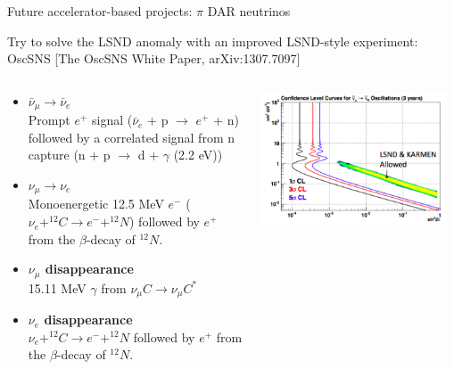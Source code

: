 \begin{frame}[t]{Future accelerator-based projects: $\pi$ DAR neutrinos}

Try to solve the LSND anomaly with an improved LSND-style experiment: OscSNS
{\color{blue}[The OscSNS White Paper, arXiv:1307.7097]}
\begin{columns}
  \begin{column}{0.50\textwidth}
     \begin{itemize}
       \item {\bf $\bar{\nu}_{\mu} \rightarrow \bar{\nu}_{e}$ }\\
         {\scriptsize
           Prompt $e^{+}$ signal ({\color{red}$\bar{\nu}_{e}$ + p $\rightarrow$ $e^{+}$ + n})
           followed by a correlated signal from n capture ({\color{red}n + p $\rightarrow$ d + $\gamma$} (2.2 eV))\\
         }
       \item {\bf $\nu_{\mu} \rightarrow \nu_{e}$ }\\
         {\scriptsize
           Monoenergetic 12.5 MeV $e^{-}$
           ({\color{red}$\nu_{e}+^{12}C \rightarrow e^{-}+^{12}N$})
           followed by $e^{+}$ from the $\beta$-decay of $^{12}N$.
         }
       \item {\bf $\nu_{\mu}$ disappearance }\\
         {\scriptsize
           15.11 MeV $\gamma$ from {\color{red}$\nu_{\mu}C \rightarrow \nu_{\mu}C^{*}$}
         }
       \item {\bf $\nu_{e}$ disappearance }\\
         {\scriptsize
           {\color{red}$\nu_{e}+^{12}C \rightarrow e^{-}+^{12}N$}
           followed by $e^{+}$ from the $\beta$-decay of $^{12}N$.
         }
     \end{itemize}
  \end{column}
  \begin{column}{0.50\textwidth}
    \includegraphics[width=0.95\textwidth]{./images/beyond3nu/future/oscsns_sensitivity.png}
  \end{column}
\end{columns}
\end{frame}


